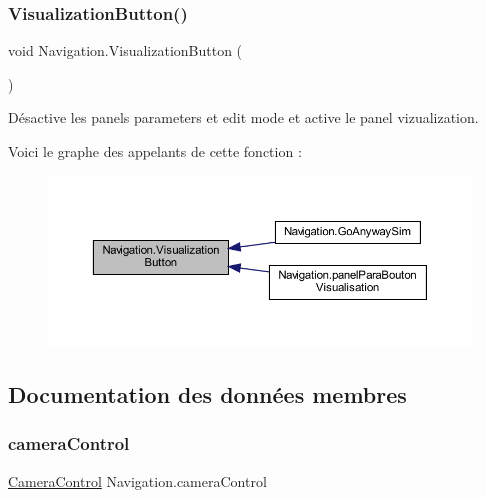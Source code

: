 \subsubsection{\texorpdfstring{Visualization\+Button()}{VisualizationButton()}}
{\footnotesize\ttfamily void Navigation.\+Visualization\+Button (\begin{DoxyParamCaption}{ }\end{DoxyParamCaption})\hspace{0.3cm}{\ttfamily [inline]}}



Désactive les panels parameters et edit mode et active le panel vizualization. 

Voici le graphe des appelants de cette fonction \+:\nopagebreak
\begin{figure}[H]
\begin{center}
\leavevmode
\includegraphics[width=350pt]{class_navigation_ad4dbf103497aef10cc636c40f84dbdde_icgraph}
\end{center}
\end{figure}


\subsection{Documentation des données membres}
\mbox{\label{class_navigation_a8ee62aef67edcc54d1478d20c22fff12}} 
\subsubsection{\texorpdfstring{camera\+Control}{cameraControl}}
{\footnotesize\ttfamily \mbox{\hyperlink{class_camera_control}{Camera\+Control}} Navigation.\+camera\+Control\hspace{0.3cm}{\ttfamily [private]}}



